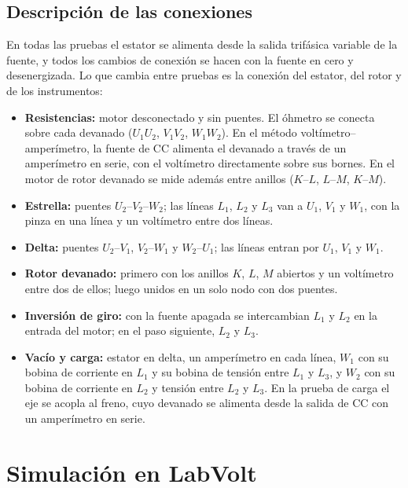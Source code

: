 \documentclass[conference]{IEEEtran}
\begin{document}
\subsection{Descripción de las conexiones}
En todas las pruebas el estator se alimenta desde la salida trifásica variable de la fuente, y todos los cambios de conexión se hacen con la fuente en cero y desenergizada. Lo que cambia entre pruebas es la conexión del estator, del rotor y de los instrumentos:
\begin{itemize}
\item \textbf{Resistencias:} motor desconectado y sin puentes. El óhmetro se conecta sobre cada devanado ($U_1U_2$, $V_1V_2$, $W_1W_2$). En el método voltímetro--amperímetro, la fuente de CC alimenta el devanado a través de un amperímetro en serie, con el voltímetro directamente sobre sus bornes. En el motor de rotor devanado se mide además entre anillos ($K$--$L$, $L$--$M$, $K$--$M$).
\item \textbf{Estrella:} puentes $U_2$--$V_2$--$W_2$; las líneas $L_1$, $L_2$ y $L_3$ van a $U_1$, $V_1$ y $W_1$, con la pinza en una línea y un voltímetro entre dos líneas.
\item \textbf{Delta:} puentes $U_2$--$V_1$, $V_2$--$W_1$ y $W_2$--$U_1$; las líneas entran por $U_1$, $V_1$ y $W_1$.
\item \textbf{Rotor devanado:} primero con los anillos $K$, $L$, $M$ abiertos y un voltímetro entre dos de ellos; luego unidos en un solo nodo con dos puentes.
\item \textbf{Inversión de giro:} con la fuente apagada se intercambian $L_1$ y $L_2$ en la entrada del motor; en el paso siguiente, $L_2$ y $L_3$.
\item \textbf{Vacío y carga:} estator en delta, un amperímetro en cada línea, $W_1$ con su bobina de corriente en $L_1$ y su bobina de tensión entre $L_1$ y $L_3$, y $W_2$ con su bobina de corriente en $L_2$ y tensión entre $L_2$ y $L_3$. En la prueba de carga el eje se acopla al freno, cuyo devanado se alimenta desde la salida de CC con un amperímetro en serie.
\end{itemize}

\section{Simulación en LabVolt}
\end{document}
